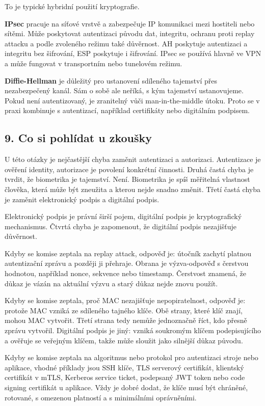 To je typické hybridní použití kryptografie.

\textbf{IPsec} pracuje na síťové vrstvě a zabezpečuje IP komunikaci mezi hostiteli nebo sítěmi. Může poskytovat autentizaci původu dat, integritu, ochranu proti replay attacku a podle zvoleného režimu také důvěrnost. AH poskytuje autentizaci a integritu bez šifrování, ESP poskytuje i šifrování. IPsec se používá hlavně ve VPN a může fungovat v transportním nebo tunelovém režimu.

\textbf{Diffie-Hellman} je důležitý pro ustanovení sdíleného tajemství přes nezabezpečený kanál. Sám o sobě ale neříká, s kým tajemství ustanovujeme. Pokud není autentizovaný, je zranitelný vůči man-in-the-middle útoku. Proto se v praxi kombinuje s autentizací, například certifikáty nebo digitálním podpisem.

\subsection*{9. Co si pohlídat u zkoušky}

U této otázky je nejčastější chyba zaměnit autentizaci a autorizaci. Autentizace je ověření identity, autorizace je povolení konkrétní činnosti. Druhá častá chyba je tvrdit, že biometrika je tajemství. Není. Biometrika je spíš měřitelná vlastnost člověka, která může být zneužita a kterou nejde snadno změnit. Třetí častá chyba je zaměnit elektronický podpis a digitální podpis.

Elektronický podpis je právní širší pojem, digitální podpis je kryptografický mechanismus. Čtvrtá chyba je zapomenout, že digitální podpis nezajišťuje důvěrnost.

Kdyby se komise zeptala na replay attack, odpověď je: útočník zachytí platnou autentizační zprávu a později ji přehraje. Obrana je výzva-odpověď s čerstvou hodnotou, například nonce, sekvence nebo timestamp. Čerstvost znamená, že důkaz je vázán na aktuální výzvu a starý důkaz nejde znovu použít.

Kdyby se komise zeptala, proč MAC nezajišťuje nepopiratelnost, odpověď je: protože MAC vzniká ze sdíleného tajného klíče. Obě strany, které klíč znají, mohou MAC vytvořit. Třetí strana tedy nemůže jednoznačně říct, kdo přesně zprávu vytvořil. Digitální podpis je jiný: vzniká soukromým klíčem podepisujícího a ověřuje se veřejným klíčem, takže může sloužit jako silnější důkaz původu.

Kdyby se komise zeptala na algoritmus nebo protokol pro autentizaci stroje nebo aplikace, vhodné příklady jsou SSH klíče, TLS serverový certifikát, klientský certifikát v mTLS, Kerberos service ticket, podepsaný JWT token nebo code signing certifikát u aplikace. Vždy je dobré dodat, že klíče musí být chráněné, rotované, s omezenou platností a s minimálními oprávněními.

